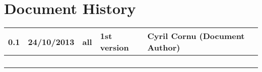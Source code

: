 \documentclass{template/openetcs_article}
\begin{document}
\section*{Document History}

\begin{flushleft}

\begin{supertabular}{m{1.1cm}m{1.8cm}m{2cm}m{5cm}m{4cm}}
\hline

 0.1 & 24/10/2013 & all & 1st version & Cyril Cornu (Document Author)\\ \hline
 & & & & \\ \hline
 & & & & \\ \hline
 & & & & \\ \hline
 & & & & \\ \hline
\end{supertabular}
\end{flushleft}
\end{document}
